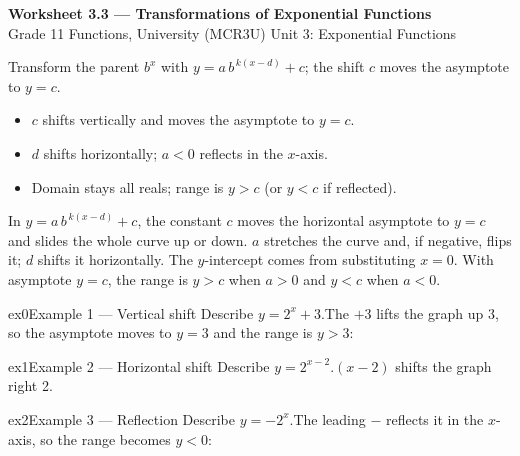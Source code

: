 \documentclass[11pt]{article}
\begin{document}
\begin{center}
{\LARGE\bfseries\color{titleblue}Worksheet 3.3 --- Transformations of Exponential Functions}\\[2pt]
{\small Grade 11 Functions, University (MCR3U) \textperiodcentered{} Unit 3: Exponential Functions}
\end{center}

\begin{ideabox}
Transform the parent $b^{x}$ with $y=a\,b^{\,k(x-d)}+c$; the shift $c$ moves the asymptote to $y=c$.
\begin{itemize}[leftmargin=*,itemsep=2pt]
  \item $c$ shifts vertically and moves the asymptote to $y=c$.
  \item $d$ shifts horizontally; $a<0$ reflects in the $x$-axis.
  \item Domain stays all reals; range is $y>c$ (or $y<c$ if reflected).
\end{itemize}
\end{ideabox}

\begin{learnbox}
In $y=a\,b^{\,k(x-d)}+c$, the constant $c$ moves the horizontal asymptote to $y=c$ and slides the whole curve up or down.
$a$ stretches the curve and, if negative, flips it; $d$ shifts it horizontally. The $y$-intercept comes from substituting $x=0$.
With asymptote $y=c$, the range is $y>c$ when $a>0$ and $y<c$ when $a<0$.
\end{learnbox}


\begin{example}{ex0}{Example 1 --- Vertical shift}
Describe $y=2^{x}+3$.\soln The $+3$ lifts the graph up 3, so the asymptote moves to $y=3$ and the range is $y>3$:
\end{example}

\begin{example}{ex1}{Example 2 --- Horizontal shift}
Describe $y=2^{x-2}$.\soln $(x-2)$ shifts the graph right 2.
\end{example}

\begin{example}{ex2}{Example 3 --- Reflection}
Describe $y=-2^{x}$.\soln The leading $-$ reflects it in the $x$-axis, so the range becomes $y<0$:
\end{example}
\end{document}
